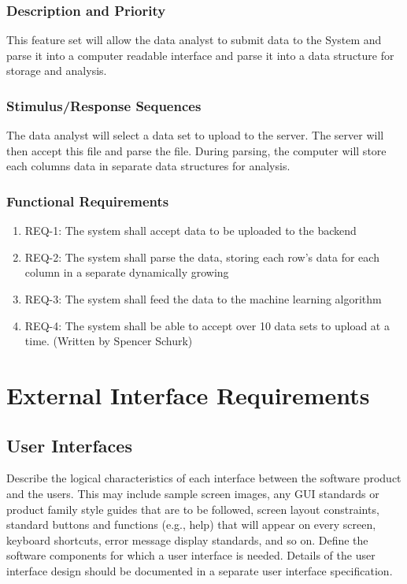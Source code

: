 \documentclass[12pt,oneside,letterpaper]{article}
\begin{document}
\subsubsection{Description and Priority}
This feature set will allow the data analyst to submit data to the System and parse it into a computer readable interface and parse it into a data structure for storage and analysis. \subsubsection{Stimulus/Response Sequences}
The data analyst will select a data set to upload to the server. The server will then accept this file and parse the file. During parsing, the computer will store each columns data in separate data structures for analysis. 
\subsubsection{Functional Requirements}
\begin{enumerate}
\item REQ-1: The system shall accept data to be uploaded to the backend
\item REQ-2: The system shall parse the data, storing each row's data for each column in a separate dynamically growing
\item REQ-3: The system shall feed the data to the machine learning algorithm
\item REQ-4: The system shall be able to accept over 10 data sets to upload at a time. (Written by Spencer Schurk)
\end{enumerate}

\section{External Interface Requirements}
\subsection{User Interfaces}
Describe the logical characteristics of each interface between the software product and the users. This may include sample screen images, any GUI standards or product family style guides that are to be followed, screen layout constraints, standard buttons and functions (e.g., help) that will appear on every screen, keyboard shortcuts, error message display standards, and so on. Define the software components for which a user interface is needed. Details of the user interface design should be documented in a separate user interface specification.
\end{document}
